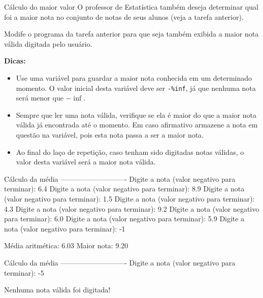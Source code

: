 \documentclass[11pt]{practice}
\begin{document}
\begin{task}[breakable]{Cálculo do maior valor}{}
  O professor de Estatística também deseja determinar qual foi a maior
  nota no conjunto de notas de seus alunos (veja a tarefa anterior).

  Modife o programa da tarefa anterior para que seja também exibida a
  maior nota válida digitada pelo usuário.

  \textbf{Dicas:}
  \begin{itemize}
    \item Use uma variável para guardar a maior nota conhecida em um
    determinado momento. O valor inicial desta variável deve ser
    \texttt{-\%inf}, já que nenhuma nota será menor que $-\inf$.
    \item Sempre que ler uma nota válida, verifique se ela é maior do
    que a maior nota válida já encontrada até o momento. Em caso
    afirmativo armazene a nota em questão na variável, pois esta nota
    passa a ser a maior nota.
    \item Ao final do laço de repetição, caso tenham sido digitadas
    notas válidas, o valor desta variável será a maior nota válida.
  \end{itemize}

  \begin{runexample}
 Cálculo da média
----------------------------
Digite a nota (valor negativo para terminar): 6.4
Digite a nota (valor negativo para terminar): 8.9
Digite a nota (valor negativo para terminar): 1.5
Digite a nota (valor negativo para terminar): 4.3
Digite a nota (valor negativo para terminar): 9.2
Digite a nota (valor negativo para terminar): 6.0
Digite a nota (valor negativo para terminar): 5.9
Digite a nota (valor negativo para terminar): -1

Média aritmética: 6.03
Maior nota: 9.20
  \end{runexample}

  \begin{runexample}
Cálculo da média
----------------------------
Digite a nota (valor negativo para terminar): -5

Nenhuma nota válida foi digitada!
  \end{runexample}

  \tcblower
  \solution
\end{task}
\end{document}

